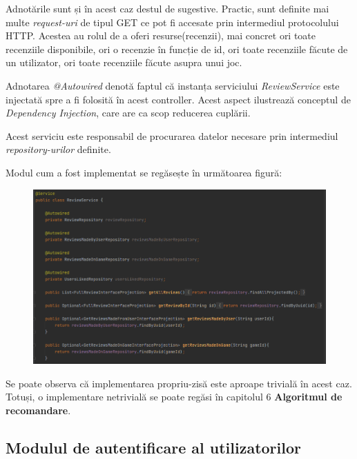 \documentclass[12pt,a4paper]{report}
\begin{document}
Adnotările sunt și în acest caz destul de sugestive. Practic, sunt definite mai multe \emph{request-uri} de tipul GET ce pot fi accesate prin intermediul protocolului HTTP. Acestea au rolul de a oferi resurse(recenzii), mai concret ori toate recenziile disponibile, ori o recenzie în funcție de id, ori toate recenziile făcute de un utilizator, ori toate recenziile făcute asupra unui joc.

Adnotarea \emph{@Autowired} denotă faptul că instanța serviciului \emph{ReviewService} este injectată spre a fi folosită în acest controller. Acest aspect ilustrează conceptul de \emph{Dependency Injection}, care are ca scop reducerea cuplării. \cite{23}

Acest serviciu este responsabil de procurarea datelor necesare prin intermediul \emph{repository-urilor} definite.

Modul cum a fost implementat se regăsește în următoarea figură:

\begin{figure}[H]
\centering
\caption{}
\begin{adjustbox}{max size={\textwidth}{\textheight}}
\includegraphics[scale = 0.65]{exemplu_22_review_service}
\end{adjustbox}
\caption*{}
\end{figure}

Se poate observa că implementarea propriu-zisă este aproape trivială în acest caz. Totuși, o implementare netrivială se poate regăsi în capitolul 6 \textbf{Algoritmul de recomandare}.





\subsection{Modulul de autentificare al utilizatorilor}
\end{document}
